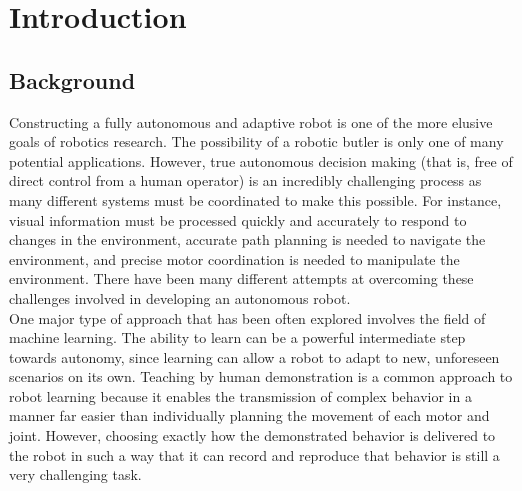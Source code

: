 \documentclass{sig-alternate}
\begin{document}
\section{Introduction}
\label{sec:intro}
\subsection{Background}
\indent Constructing a fully autonomous and adaptive robot is one of the more
elusive goals of robotics research.
The possibility of a robotic butler is only one of many potential applications. However, true
autonomous decision making (that is, free of direct control from a human operator) is an incredibly challenging process as many different systems must 
be coordinated to make this possible. For instance, visual information must be processed quickly and accurately to respond to 
changes in the environment, accurate path planning is needed to navigate the environment, and 
precise motor coordination is needed to manipulate the environment. There have been many different 
attempts at overcoming these challenges involved in developing an autonomous robot. \\
\indent One major type of approach 
that has been often explored involves the field of machine learning. The ability to learn can be a powerful intermediate 
step towards autonomy, since learning can allow a robot to adapt to new, unforeseen scenarios on its own. 
Teaching by human demonstration is a common approach to robot learning because it enables the 
transmission of complex behavior in a manner far easier than individually planning the movement of each motor and joint. However, choosing exactly how the demonstrated behavior is delivered to the 
robot in such a way that it can record and reproduce that behavior is still a very challenging task.
\end{document}

